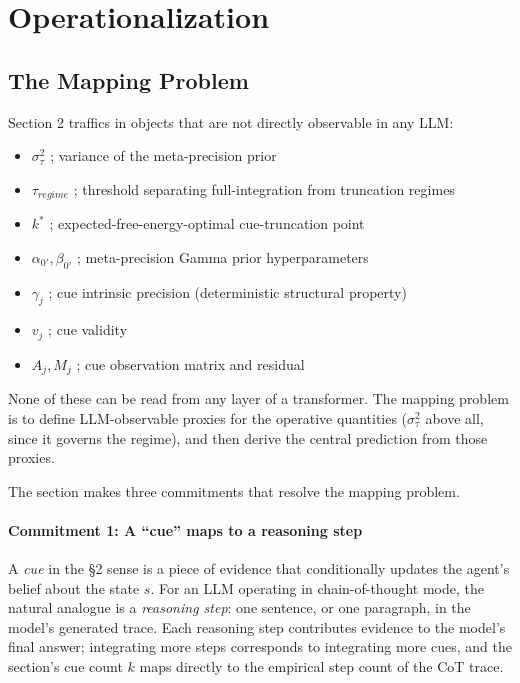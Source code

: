 \documentclass{article}
\providecommand{\tightlist}{\setlength{\itemsep}{0pt}\setlength{\parskip}{0pt}}
\begin{document}
\section{Operationalization}\label{chapter-3-operationalization}

\subsection{The Mapping Problem}\label{the-mapping-problem}

Section 2 traffics in objects that are not directly observable in any
LLM:

\begin{itemize}
\tightlist
\item
  \(\sigma_{\tau}^{2}\) ; variance of the meta-precision prior
\item
  \(\tau_{regime}\) ; threshold separating full-integration from
  truncation regimes
\item
  \(k^{*}\) ; expected-free-energy-optimal cue-truncation point
\item
  \(\alpha_{0'},\beta_{0'}\) ; meta-precision Gamma prior
  hyperparameters
\item
  \(\gamma_{j}\) ; cue intrinsic precision (deterministic structural
  property)
\item
  \(v_{j}\) ; cue validity
\item
  \(A_{j},M_{j}\) ; cue observation matrix and residual
\end{itemize}

None of these can be read from any layer of a transformer. The mapping
problem is to define LLM-observable proxies for the operative quantities
(\(\sigma_{\tau}^{2}\) above all, since it governs the regime), and then
derive the central prediction from those proxies.

The section makes three commitments that resolve the mapping problem.

\paragraph{Commitment 1: A ``cue'' maps to a reasoning
step}\label{commitment-1-a-cue-maps-to-a-reasoning-step}

A \emph{cue} in the \S{}2 sense is a piece of evidence that conditionally
updates the agent's belief about the state \(s\). For an LLM operating
in chain-of-thought mode, the natural analogue is a \emph{reasoning
step}: one sentence, or one paragraph, in the model's generated trace.
Each reasoning step contributes evidence to the model's final answer;
integrating more steps corresponds to integrating more cues, and the
section's cue count \(k\) maps directly to the empirical step count of
the CoT trace.
\end{document}
